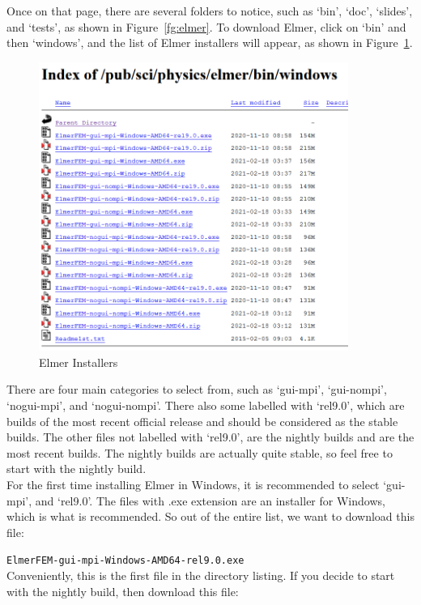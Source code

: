 Once on that page, there are several folders to notice, such as `bin', `doc', `slides', and `tests', as shown in Figure~\ref{fg:elmer}.  To download Elmer, click on `bin' and then `windows', and the list of Elmer installers will appear, as shown in Figure~\ref{fg:elmer-bin-win}.

\begin{figure}[H]
\centering
\includegraphics[width=0.9\textwidth]{elmer-bin-win}
\caption{Elmer Installers}\label{fg:elmer-bin-win}
\end{figure}

There are four main categories to select from, such as `gui-mpi', `gui-nompi', `nogui-mpi', and `nogui-nompi'.  There also some labelled with `rel9.0', which are builds of the most recent official release and should be considered as the stable builds.  The other files not labelled with `rel9.0', are the nightly builds and are the most recent builds.  The nightly builds are actually quite stable, so feel free to start with the nightly build.\\

For the first time installing Elmer in Windows, it is recommended to select `gui-mpi', and `rel9.0'.  The files with .exe extension are an installer for Windows, which is what is recommended.  So out of the entire list, we want to download this file:

\texttt{ElmerFEM-gui-mpi-Windows-AMD64-rel9.0.exe}\\

Conveniently, this is the first file in the directory listing.  If you decide to start with the nightly build, then download this file:

